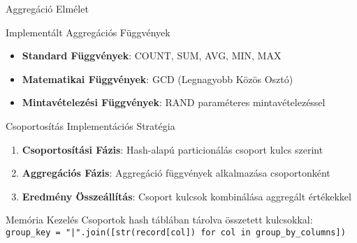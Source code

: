 \documentclass[aspectratio=169]{beamer}
\begin{document}
\begin{frame}{Aggregáció Elmélet}
\begin{block}{Implementált Aggregációs Függvények}
\begin{itemize}
    \item \textbf{Standard Függvények}: COUNT, SUM, AVG, MIN, MAX
    \item \textbf{Matematikai Függvények}: GCD (Legnagyobb Közös Osztó)
    \item \textbf{Mintavételezési Függvények}: RAND paraméteres mintavételezéssel
\end{itemize}
\end{block}

\begin{block}{Csoportosítás Implementációs Stratégia}
\begin{enumerate}
    \item \textbf{Csoportosítási Fázis}: Hash-alapú particionálás csoport kulcs szerint
    \item \textbf{Aggregációs Fázis}: Aggregáció függvények alkalmazása csoportonként
    \item \textbf{Eredmény Összeállítás}: Csoport kulcsok kombinálása aggregált értékekkel
\end{enumerate}
\end{block}

\begin{block}{Memória Kezelés}
Csoportok hash táblában tárolva összetett kulcsokkal:\\
\texttt{group\_key = "|".join([str(record[col]) for col in group\_by\_columns])}
\end{block}
\end{frame}
\end{document}
